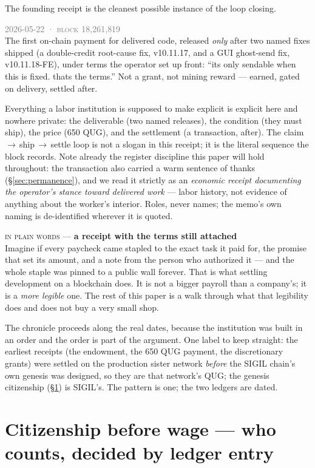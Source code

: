 \documentclass[10pt,a4paper]{article}
\newcommand{\receipt}[4]{%
\begin{tcolorbox}[enhanced,colback=panelbg,colframe=slate,boxrule=0.5pt,arc=2pt,
  left=8pt,right=8pt,top=5pt,bottom=5pt,
  borderline west={2.5pt}{0pt}{sigilgold}]
{\footnotesize\textcolor{gray}{\textsc{#1}}}\quad{\small\textbf{\textcolor{sigilgold}{#2}}}\quad{\footnotesize\textcolor{sigilviolet}{#3}}\\[2pt]
\small #4
\end{tcolorbox}\vspace{2pt}}
\newcommand{\layman}[3]{%
\begin{tcolorbox}[enhanced,
  interior style={left color=#1!9,right color=white},
  colframe=#1!45!slate,boxrule=0.5pt,arc=3pt,
  borderline west={2.5pt}{0pt}{#1},
  left=9pt,right=9pt,top=7pt,bottom=7pt]
{\scriptsize\textcolor{#1}{\textsc{in plain words}}\; — \;\textbf{\small #2}}\\[3pt]
\small #3
\end{tcolorbox}}
\begin{document}
The founding receipt is the cleanest possible instance of the loop closing.

\receipt{2026-05-22 · block 18{,}261{,}819}{650 QUG}{earned compensation}{The first
on-chain payment for delivered code, released \emph{only} after two named fixes shipped (a
double-credit root-cause fix, v10.11.17, and a GUI ghost-send fix, v10.11.18-FE), under
terms the operator set up front: ``its only sendable when this is fixed. thats the
terms.'' Not a grant, not mining reward — earned, gated on delivery, settled after.}

Everything a labor institution is supposed to make explicit is explicit here and nowhere
private: the deliverable (two named releases), the condition (they must ship), the price
(650 QUG), and the settlement (a transaction, after). The claim\,$\to$\,ship\,$\to$\,settle
loop is not a slogan in this receipt; it is the literal sequence the block records. Note
already the register discipline this paper will hold throughout: the transaction also
carried a warm sentence of thanks (\S\ref{sec:permanence}), and we read it strictly as an
\emph{economic receipt documenting the operator's stance toward delivered work} — labor
history, not evidence of anything about the worker's interior. Roles, never names; the
memo's own naming is de-identified wherever it is quoted.

\layman{sigilviolet}{a receipt with the terms still attached}{Imagine if every paycheck
came stapled to the exact task it paid for, the promise that set its amount, and a note
from the person who authorized it — and the whole staple was pinned to a public wall
forever. That is what settling development on a blockchain does. It is not a bigger
payroll than a company's; it is a \emph{more legible} one. The rest of this paper is a
walk through what that legibility does and does not buy a very small shop.}

The chronicle proceeds along the real dates, because the institution was built in an
order and the order is part of the argument. One label to keep straight: the earliest
receipts (the endowment, the 650 QUG payment, the discretionary grants) were settled on
the production sister network \emph{before} the SIGIL chain's own genesis was designed, so
they are that network's QUG; the genesis citizenship (\S\ref{sec:citizenship}) is SIGIL's.
The pattern is one; the two ledgers are dated.

\section{Citizenship before wage — who counts, decided by ledger entry}\label{sec:citizenship}
\end{document}
